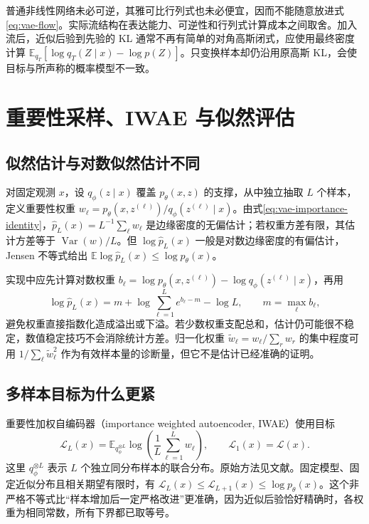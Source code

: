 \documentclass[UTF8,12pt,a4paper,fontset=fandol]{ctexart}
\begin{document}
普通非线性网络未必可逆，其雅可比行列式也未必便宜，因而不能随意放进式\eqref{eq:vae-flow}。实际流结构在表达能力、可逆性和行列式计算成本之间取舍。加入流后，近似后验到先验的 KL 通常不再有简单的对角高斯闭式，应使用最终密度计算 $\mathbb E_{q_T}[\log q_T(Z\mid x)-\log p(Z)]$。只变换样本却仍沿用原高斯 KL，会使目标与所声称的概率模型不一致。

\section{重要性采样、IWAE 与似然评估}
\label{sec:vae-iwae}

\subsection{似然估计与对数似然估计不同}
对固定观测 $x$，设 $q_\phi(z\mid x)$ 覆盖 $p_\theta(x,z)$ 的支撑，从中独立抽取 $L$ 个样本，定义重要性权重 $w_\ell=p_\theta(x,z^{(\ell)})/q_\phi(z^{(\ell)}\mid x)$。由式\eqref{eq:vae-importance-identity}，$\widehat p_L(x)=L^{-1}\sum_\ell w_\ell$ 是边缘密度的无偏估计；若权重方差有限，其估计方差等于 $\operatorname{Var}(w)/L$。但 $\log\widehat p_L(x)$ 一般是对数边缘密度的有偏估计，Jensen 不等式给出 $\mathbb E\log\widehat p_L(x)\leq\log p_\theta(x)$。

实现中应先计算对数权重 $b_\ell=\log p_\theta(x,z^{(\ell)})-\log q_\phi(z^{(\ell)}\mid x)$，再用
\begin{equation}
 \log\widehat p_L(x)
 =m+\log\sum_{\ell=1}^{L}e^{b_\ell-m}-\log L,
 \qquad m=\max_\ell b_\ell,
 \label{eq:vae-logmeanexp}
\end{equation}
避免权重直接指数化造成溢出或下溢。若少数权重支配总和，估计仍可能很不稳定，数值稳定技巧不会消除统计方差。归一化权重 $\widetilde w_\ell=w_\ell/\sum_rw_r$ 的集中程度可用 $1/\sum_\ell\widetilde w_\ell^2$ 作为有效样本量的诊断量，但它不是估计已经准确的证明。

\subsection{多样本目标为什么更紧}
重要性加权自编码器（importance weighted autoencoder, IWAE）使用目标
\begin{equation}
 \mathcal L_L(x)=\mathbb E_{q_\phi^{\otimes L}}
       \log\left(\frac1L\sum_{\ell=1}^{L}w_\ell\right),
 \qquad \mathcal L_1(x)=\mathcal L(x).
 \label{eq:vae-iwae}
\end{equation}
这里 $q_\phi^{\otimes L}$ 表示 $L$ 个独立同分布样本的联合分布。原始方法见文献\cite{burda2016}。固定模型、固定近似分布且相关期望有限时，有 $\mathcal L_L(x)\leq\mathcal L_{L+1}(x)\leq\log p_\theta(x)$。这个非严格不等式比“样本增加后一定严格改进”更准确，因为近似后验恰好精确时，各权重为相同常数，所有下界都已取等号。
\end{document}
